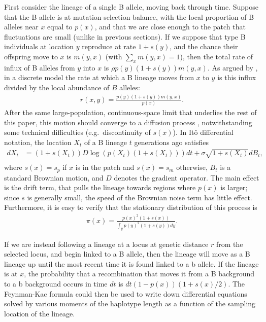 \documentclass{article}
\begin{document}
First consider the lineage of a single B allele, moving back through time.
Suppose that the B allele is at mutation-selection balance, 
with the local proportion of B alleles near $x$ equal to $p(x)$,
and that we are close enough to the patch that fluctuations are small (unlike in previous sections).
If we suppose that type B individuals at location $y$ reproduce at rate $1+s(y)$,
and the chance their offspring move to $x$ is $m(y,x)$ (with $\sum_x m(y,x)=1$),
then the total rate of influx of B alleles from $y$ into $x$ is $\rho p(y) (1+s(y)) m(y,x)$.
As argued by \citet{hudson},
in a discrete model the rate at which a B lineage moves from $x$ to $y$
is this influx divided by the local abundance of $B$ alleles:
\begin{align}
  r(x,y) = \frac{ p(y) (1+s(y)) m(y,x) }{ p(x) } .
\end{align}
After the same large-population, continuous-space limit that underlies the rest of this paper,
this motion should converge to a diffusion process \citep[that is similar to that studied by][]{hallatschek},
notwithstanding some technical difficulties (e.g.\ discontinuity of $s(x)$).
In It\^o differential notation, 
the location $X_t$ of a B lineage $t$ generations ago satisfies
\begin{align}
  d X_t &= (1+s(X_t)) D \log( p(X_t) (1+s(X_t)) ) dt + \sigma \sqrt{1+s(X_t)} dB_t,\\
\end{align}
where $s(x)=s_p$ if $x$ is in the patch and $s(x)=s_m$ otherwise, 
$B_t$ is a standard Brownian motion, and $D$ denotes the gradient operator.
The main effect is the drift term, that pulls the lineage towards regions where $p(x)$ is larger;
since $s$ is generally small, the speed of the Brownian noise term has little effect.
Furthermore, it is easy to verify that the stationary distribution of this process is
\begin{align}
  \pi(x) = \frac{ p(x)^2 (1+s(x)) }{ \int_y p(y)^2 (1+s(y)) dy } .
\end{align}

If we are instead following a lineage at a locus at genetic distance $r$ from the selected locus,
and begin linked to a B allele,
then the lineage will move as a B lineage up until the most recent time
it is found linked to a b allele.
If the lineage is at $x$, the probability that a recombination that moves it from a B background
to a b background occurs in time $dt$ is $dt (1-p(x)) (1+s(x)/2)$.
The Feynman-Kac formula could then be used to write down differential equations
solved by various moments of the haplotype length as a function of the sampling location of the lineage.
\end{document}
